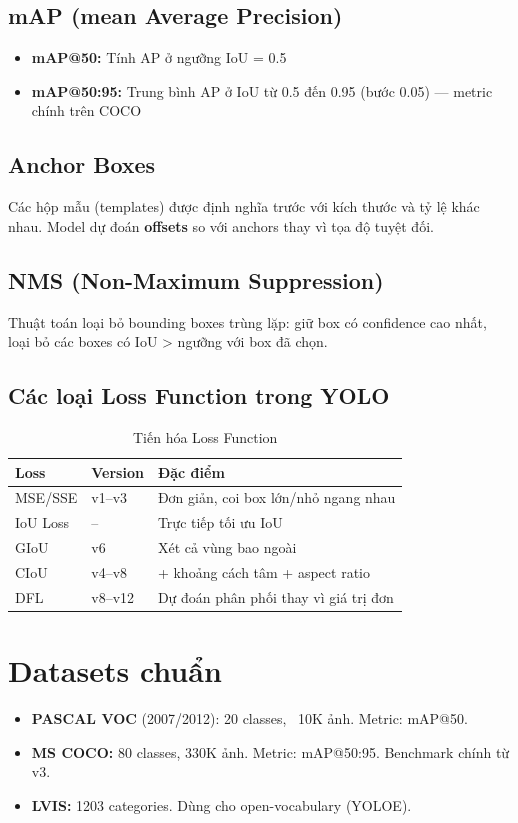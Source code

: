 \subsection{mAP (mean Average Precision)}
\begin{itemize}
    \item \textbf{mAP@50:} Tính AP ở ngưỡng IoU = 0.5
    \item \textbf{mAP@50:95:} Trung bình AP ở IoU từ 0.5 đến 0.95 (bước 0.05) — metric chính trên COCO
\end{itemize}

\subsection{Anchor Boxes}
Các hộp mẫu (templates) được định nghĩa trước với kích thước và tỷ lệ khác nhau. Model dự đoán \textbf{offsets} so với anchors thay vì tọa độ tuyệt đối.

\subsection{NMS (Non-Maximum Suppression)}
Thuật toán loại bỏ bounding boxes trùng lặp: giữ box có confidence cao nhất, loại bỏ các boxes có IoU > ngưỡng với box đã chọn.

\subsection{Các loại Loss Function trong YOLO}

\begin{table}[H]
\centering
\caption{Tiến hóa Loss Function}
\begin{tabular}{lll}
\toprule
\textbf{Loss} & \textbf{Version} & \textbf{Đặc điểm} \\
\midrule
MSE/SSE & v1--v3 & Đơn giản, coi box lớn/nhỏ ngang nhau \\
IoU Loss & -- & Trực tiếp tối ưu IoU \\
GIoU & v6 & Xét cả vùng bao ngoài \\
CIoU & v4--v8 & + khoảng cách tâm + aspect ratio \\
DFL & v8--v12 & Dự đoán phân phối thay vì giá trị đơn \\
\bottomrule
\end{tabular}
\end{table}

\section{Datasets chuẩn}

\begin{itemize}
    \item \textbf{PASCAL VOC} (2007/2012): 20 classes, ~10K ảnh. Metric: mAP@50.
    \item \textbf{MS COCO:} 80 classes, 330K ảnh. Metric: mAP@50:95. Benchmark chính từ v3.
    \item \textbf{LVIS:} 1203 categories. Dùng cho open-vocabulary (YOLOE).
\end{itemize}
